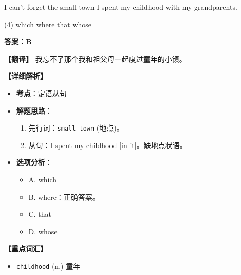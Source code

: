 \documentclass[11pt, a4paper]{article}
\newcommand{\analysis}[4]{
    \begin{solutionbox}
        \textbf{答案：#1}
        
        \textbf{【翻译】} #2
        
        \textbf{【详细解析】}
        #3
        
        \textbf{【重点词汇】}
        #4
    \end{solutionbox}
}
\newcommand{\blank}{\underline{\hspace{1.5cm}}}
\begin{document}
\begin{questions}
    \item I can't forget the small town \blank I spent my childhood with my grandparents.
    \begin{tasks}(4)
        \task which \task where \task that \task whose
    \end{tasks}
    \analysis{B}{我忘不了那个我和祖父母一起度过童年的小镇。}{
        \begin{itemize}
            \item \textbf{考点}：定语从句
            \item \textbf{解题思路}：
                \begin{enumerate}
                    \item 先行词：\texttt{small town} (地点)。
                    \item 从句：I spent my childhood [in it]。缺地点状语。
                \end{enumerate}
            \item \textbf{选项分析}：
                \begin{itemize}
                    \item A. which
                    \item B. where：正确答案。
                    \item C. that
                    \item D. whose
                \end{itemize}
        \end{itemize}
    }{
        \begin{itemize}
            \item \texttt{childhood} (n.) 童年
        \end{itemize}
    }


\end{questions}
\end{document}
